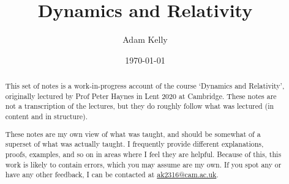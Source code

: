 \documentclass[a4paper]{scrreprt}
\title{Dynamics and Relativity}
\author{Adam Kelly}
\date{\today}
\begin{document}
\maketitle

\begin{abstract}
	

	This set of notes is a work-in-progress account of the course `Dynamics and Relativity', originally lectured by Prof Peter Haynes in Lent 2020 at Cambridge. These notes are not a transcription of the lectures, but they do roughly follow what was lectured (in content and in structure).

	These notes are my own view of what was taught, and should be somewhat of a superset of what was actually taught. I frequently provide different explanations, proofs, examples, and so on in areas where I feel they are helpful. Because of this, this work is likely to contain errors, which you may assume are my own. If you spot any or have any other feedback, I can be contacted at \href{mailto:ak2316@cam.ac.uk}{ak2316@cam.ac.uk}.



\end{abstract}

\tableofcontents



\end{document}
